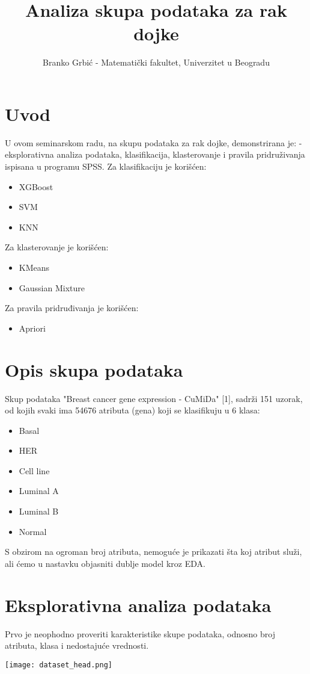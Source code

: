 \documentclass[a4paper]{article}
\title{Analiza skupa podataka za rak dojke}
\author{Branko Grbić - Matematički fakultet, Univerzitet u Beogradu}
\begin{document}
\maketitle


\tableofcontents

\newpage

\section{Uvod}
    \quad U ovom seminarskom radu, na skupu podataka za rak dojke, demonstrirana je: - eksplorativna analiza podataka, klasifikacija, klasterovanje i pravila pridruživanja ispisana u programu SPSS. 
    Za klasifikaciju je korišćen:
    \begin{itemize}
        \item XGBoost
        \item SVM
        \item KNN
    \end{itemize}
    Za klasterovanje je korišćen:
    \begin{itemize}
        \item KMeans
        \item Gaussian Mixture
    \end{itemize}
    Za pravila pridruđivanja je korišćen:
    \begin{itemize}
        \item Apriori
    \end{itemize}

\section{Opis skupa podataka}
    \quad Skup podataka "Breast cancer gene expression - CuMiDa" [1], sadrži 151 uzorak, od kojih svaki ima 54676 atributa (gena) koji se klasifikuju u 6 klasa:
    \begin{itemize}
        \item Basal
        \item HER
        \item Cell line
        \item Luminal A
        \item Luminal B
        \item Normal
    \end{itemize}
    S obzirom na ogroman broj atributa, nemoguće je prikazati šta koj atribut služi, ali ćemo u nastavku objasniti dublje model kroz EDA.
    

\section{Eksplorativna analiza podataka}
    Prvo je neophodno proveriti karakteristike skupe podataka, odnosno broj atributa, klasa i nedostajuće vrednosti.
    \begin{center}
        \label{im:dataset_head}
        \texttt{[image: dataset\_head.png]}
    \end{center}
\end{document}
